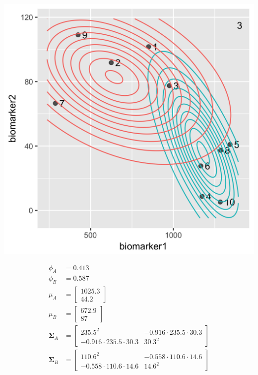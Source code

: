 \begin{enumerate}
\begin{minipage}[t]{0.45\textwidth}
\begin{center}
\includegraphics[scale=0.15]{img/biomarker-data-labels-3.png}
\end{center}
\end{minipage}
\qquad
\begin{minipage}[t]{0.45\textwidth}
\small
\begin{align*} 
\phi_A &= 0.413 \\
\phi_B &= 0.587 \\
\mu_A &= \begin{bmatrix} 1025.3 \\ 44.2 \end{bmatrix} \\
\mu_B &= \begin{bmatrix} 672.9 \\ 87 \end{bmatrix} \\
\boldsymbol\Sigma_A &= \begin{bmatrix} 235.5^2 & -0.916 \cdot 235.5 \cdot 30.3 \\ -0.916 \cdot 235.5 \cdot 30.3 & 30.3^2 \end{bmatrix} \\
\boldsymbol\Sigma_B &= \begin{bmatrix} 110.6^2 & -0.558 \cdot 110.6 \cdot 14.6 \\ -0.558 \cdot 110.6 \cdot 14.6 & 14.6^2 \end{bmatrix} 
\end{align*}
\end{minipage}


\end{enumerate}
